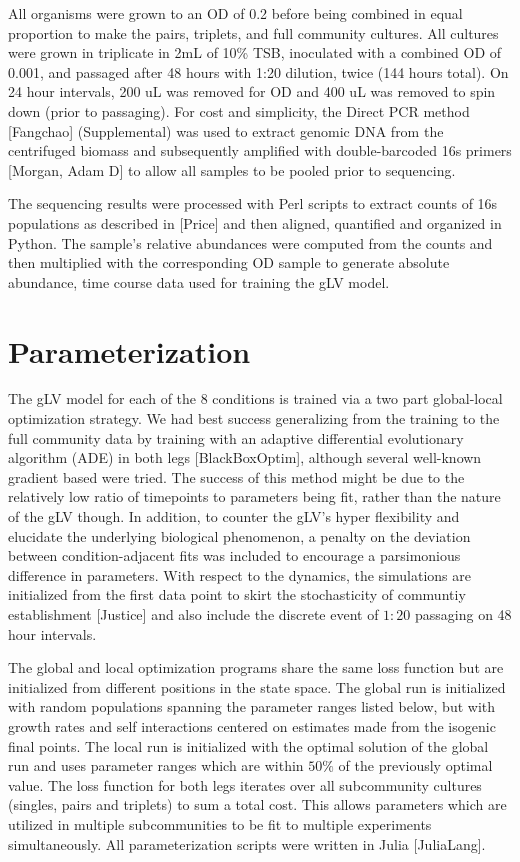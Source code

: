 \documentclass[twocolumn, 10pt]{report}
\begin{document}
{All organisms were grown to an OD of 0.2 before being combined in equal proportion to make the pairs, triplets, and full community cultures. All cultures were grown in triplicate in 2mL of 10\% TSB, inoculated with a combined OD of 0.001, and passaged after 48 hours with 1:20 dilution, twice (144 hours total). On 24 hour intervals, 200 uL was removed for OD and 400 uL was removed to spin down (prior to passaging). For cost and simplicity, the Direct PCR method [Fangchao] (Supplemental) was used to extract genomic DNA from the centrifuged biomass and subsequently amplified with double-barcoded 16s primers [Morgan, Adam D] to allow all samples to be pooled prior to sequencing. 

The sequencing results were processed with Perl scripts to extract counts of 16s populations as described in [Price] and then aligned, quantified and organized in Python. The sample's relative abundances were computed from the counts and then multiplied with the corresponding OD sample to generate absolute abundance, time course data used for training the gLV model. 

\section*{Parameterization}

The gLV model for each of the 8 conditions is trained via a two part global-local optimization strategy. We had best success generalizing from the training to the full community data by training with an adaptive differential evolutionary algorithm (ADE) in both legs [BlackBoxOptim], although several well-known gradient based were tried. The success of this method might be due to the relatively low ratio of timepoints to parameters being fit, rather than the nature of the gLV though. In addition, to counter the gLV's hyper flexibility and elucidate the underlying biological phenomenon, a penalty on the deviation between condition-adjacent fits was included to encourage a parsimonious difference in parameters. With respect to the dynamics, the simulations are initialized from the first data point to skirt the stochasticity of communtiy establishment [Justice] and also include the discrete event of $1:20$ passaging on 48 hour intervals.

The global and local optimization programs share the same loss function but are initialized from different positions in the state space. The global run is initialized with random populations spanning the parameter ranges listed below, but with growth rates and self interactions centered on estimates made from the isogenic final points. The local run is initialized with the optimal solution of the global run and uses parameter ranges which are within $50\%$ of the previously optimal value. The loss function for both legs iterates over all subcommunity cultures (singles, pairs and triplets) to sum a total cost. This allows parameters which are utilized in multiple subcommunities to be fit to multiple experiments simultaneously. All parameterization scripts were written in Julia [JuliaLang].

}
\end{document}
